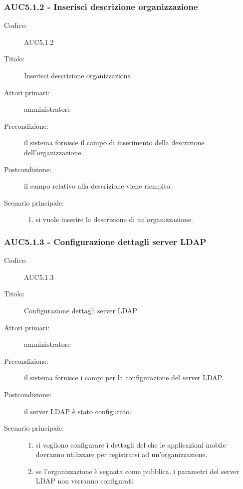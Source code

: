 \documentclass[../../../analisi-dei-requisiti.tex]{subfiles}
\begin{document}
\subsubsection{AUC5.1.2 - Inserisci descrizione organizzazione}%
  \label{subs:AUC5.1.2}
  \begin{description}
    \item[Codice:] AUC5.1.2
    \item[Titolo:] Inserisci descrizione organizzazione
    \item[Attori primari:] amministratore
    \item[Precondizione:] il sistema fornisce il campo di inserimento della descrizione dell'organizzazione.
    \item[Postcondizione:] il campo relativo alla descrizione viene riempito.
    \item[Scenario principale:]
    \begin{enumerate}
      \item si vuole inserire la descrizione di un'organizzazione.
    \end{enumerate}
  \end{description}

\subsubsection{AUC5.1.3 - Configurazione dettagli server LDAP}%
  \label{subs:AUC5.1.3}
  \begin{description}
    \item[Codice:] AUC5.1.3
    \item[Titolo:] Configurazione dettagli server LDAP
    \item[Attori primari:] amministratore
    \item[Precondizione:] il sistema fornisce i campi per la configurazione del server LDAP.
    \item[Postcondizione:] il server LDAP è stato configurato.
    \item[Scenario principale:]
    \begin{enumerate}
      \item si vogliono configurare i dettagli del  che le applicazioni mobile dovranno utilizzare per registrarsi ad un'organizzazione.
      \item se l'organizzazione è segnata come pubblica, i parametri del server LDAP non verranno configurati.
    \end{enumerate}
  \end{description}
\end{document}
